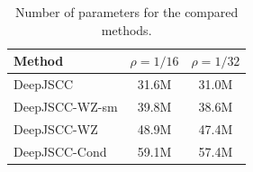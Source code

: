 \begin{table}[t]
\centering
\caption{Number of parameters for the compared methods.}
\label{tab:num_parameters}
\begin{tabular}{lcc}
\toprule
Method & $\rho = 1/16$ & $\rho = 1/32$ \\
\midrule
DeepJSCC & 31.6M & 31.0M \\
DeepJSCC-WZ-sm & 39.8M & 38.6M \\
DeepJSCC-WZ & 48.9M & 47.4M \\
DeepJSCC-Cond & 59.1M & 57.4M \\
\bottomrule
\end{tabular}
\end{table}
